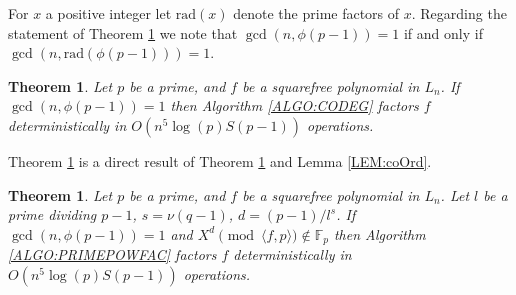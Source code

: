\documentclass{article}
\newcounter{dummy} \numberwithin{dummy}{section}
\theoremstyle{plain}
\newtheorem{thm}[dummy]{Theorem}
\theoremstyle{definition}
\def\Fp {{ \mathbb{F} _ {p} }}
\def\rad {{ \mathrm{rad}}}
\begin{document}
    For $x$ a positive integer let $\rad(x)$ denote the prime factors of $x$. Regarding the statement of Theorem \ref{THM:CoDeg} we note that $\gcd(n,\phi(p-1))=1$ if and only if $\gcd(n,\rad(\phi(p-1)) )=1$.
			
		\begin{thm}
		\label{THM:CoDeg}
		    Let $p$ be a prime, and $f$ be a squarefree polynomial in $L_n$. If $\gcd(n,\phi(p-1))=1$ then Algorithm \ref{ALGO:CODEG} factors $f$ deterministically in $O(n^{5}\log(p)S(p-1))$ operations.
		\end{thm}	
		
	  Theorem \ref{THM:CoDeg} is a direct result of Theorem \ref{THM:pp} and Lemma \ref{LEM:coOrd}.
		
		\begin{thm}
		\label{THM:pp}
		    Let $p$ be a prime, and $f$ be a squarefree polynomial in $L_n$. Let $l$ be a prime dividing $p-1$, $s=\nu(q-1)$, $d=(p-1)/l^s$. If $\gcd(n,\phi(p-1))=1$ and $X^d \pmod{\langle f,p \rangle} \not\in \Fp$ then Algorithm \ref{ALGO:PRIMEPOWFAC} factors $f$ deterministically in $O(n^{5}\log(p)S(p-1))$ operations.
		\end{thm}	
		
\end{document}
